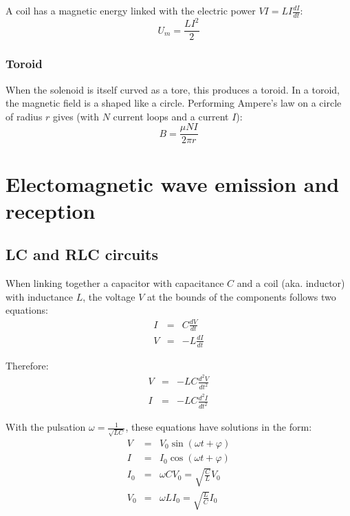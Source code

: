 \documentclass[a4paper,10pt]{article}
\begin{document}
A coil has a magnetic energy linked with the electric power $VI = LI \frac{dI}{dt}$:
\begin{equation}
  U_m = \frac{LI^2}{2}
\end{equation}

\subsubsection{Toroid}

When the solenoid is itself curved as a tore, this produces a toroid.
In a toroid, the magnetic field is a shaped like a circle.
Performing Ampere's law on a circle of radius $r$ gives (with $N$ current loops and a current $I$):
\begin{equation}
  B = \frac{\mu N I}{2 \pi r}
\end{equation}

\section{Electomagnetic wave emission and reception}

\subsection{LC and RLC circuits}

When linking together a capacitor with capacitance $C$ and a coil (aka. inductor) with inductance $L$, the voltage $V$ at the bounds of the components follows two equations:
\begin{eqnarray}
  I &=& C \frac{dV}{dt} \\
  V &=& -L \frac{dI}{dt}
\end{eqnarray}

Therefore:
\begin{eqnarray}
  V &=& -LC \frac{d^2V}{dt^2} \\
  I &=& -LC \frac{d^2I}{dt^2}
\end{eqnarray}

With the pulsation $\omega = \frac{1}{\sqrt{LC}}$, these equations have solutions in the form:
\begin{eqnarray}
  V &=& V_0 \sin(\omega t + \varphi) \\
  I &=& I_0 \cos(\omega t + \varphi) \\
  I_0 &=& \omega C V_0 = \sqrt{\frac{C}{L}} V_0 \\
  V_0 &=& \omega L I_0 = \sqrt{\frac{L}{C}} I_0
\end{eqnarray}
\end{document}
